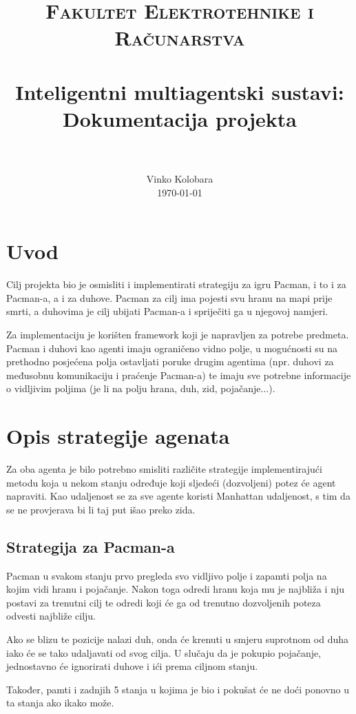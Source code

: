 \documentclass[paper=a4, fontsize=11pt]{scrartcl}
\title{
		\usefont{OT1}{bch}{b}{n}
		\normalfont \normalsize \textsc{Fakultet Elektrotehnike i Računarstva} \\ [25pt]
		\horrule{0.5pt} \\[0.4cm]
		\huge Inteligentni multiagentski sustavi:\\Dokumentacija projekta\\
		\horrule{2pt} \\[0.5cm]
}
\author{
		\normalfont 								\normalsize
        Vinko Kolobara\\[-3pt]		\normalsize
        \today
}
\date{}
\numberwithin{equation}{section}		%
\numberwithin{figure}{section}			%
\numberwithin{table}{section}				%
\begin{document}
\maketitle

\pagebreak

\section{Uvod}

Cilj projekta bio je osmisliti i implementirati strategiju za igru Pacman, i to i za Pacman-a, a i za duhove. Pacman za cilj ima pojesti svu hranu na mapi prije smrti, a duhovima je cilj ubijati Pacman-a i spriječiti ga u njegovoj namjeri.

Za implementaciju je korišten framework koji je napravljen za potrebe predmeta. Pacman i duhovi kao agenti imaju ograničeno vidno polje, u mogućnosti su na prethodno posjećena polja ostavljati poruke drugim agentima (npr. duhovi za međusobnu komunikaciju i praćenje Pacman-a) te imaju sve potrebne informacije o vidljivim poljima (je li na polju hrana, duh, zid, pojačanje...).

\section{Opis strategije agenata}
Za oba agenta je bilo potrebno smisliti različite strategije implementirajući metodu koja u nekom stanju određuje koji sljedeći (dozvoljeni) potez će agent napraviti. Kao udaljenost se za sve agente koristi Manhattan udaljenost, s tim da se ne provjerava bi li taj put išao preko zida.

\subsection{Strategija za Pacman-a}
Pacman u svakom stanju prvo pregleda svo vidljivo polje i zapamti polja na kojim vidi hranu i pojačanje. Nakon toga odredi hranu koja mu je najbliža i nju postavi za trenutni cilj te odredi koji će ga od trenutno dozvoljenih poteza odvesti najbliže cilju. 

Ako se blizu te pozicije nalazi duh, onda će krenuti u smjeru suprotnom od duha iako će se tako udaljavati od svog cilja. U slučaju da je pokupio pojačanje, jednostavno će ignorirati duhove i ići prema ciljnom stanju. 

Također, pamti i zadnjih 5 stanja u kojima je bio i pokušat će ne doći ponovno u ta stanja ako ikako može. 
\end{document}
